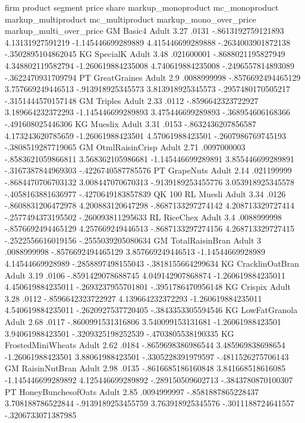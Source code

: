 firm	product	segment	price	share	markup_monoproduct	mc_monoproduct	markup_multiproduct	mc_multiproduct	markup_mono_over_price	markup_multi_over_price
GM	Basic4	Adult	3.27	.0131	-.8613192759121893	4.13131927591219	-1.145446699289889	4.415446699289888	-.2634003901872138	-.3502895104862045
KG	SpecialK	Adult	3.48	.021600001	-.8688021195827949	4.348802119582794	-1.260619884235008	4.740619884235008	-.2496557814893089	-.3622470931709794
PT	GreatGraines	Adult	2.9	.0088999998	-.8576692494465129	3.757669249446513	-.913918925345573	3.813918925345573	-.2957480170505217	-.3151444570157148
GM	Triples	Adult	2.33	.0112	-.8596642323722927	3.189664232372293	-1.145446699289893	3.475446699289893	-.368954606168366	-.491608025446306
KG	Mueslix	Adult	3.31	.0153	-.8632436207856587	4.173243620785659	-1.26061988423501	4.57061988423501	-.2607986769745193	-.3808519287719065
GM	OtmlRaisinCrisp	Adult	2.71	.0097000003	-.8583621059866811	3.568362105986681	-1.145446699289891	3.855446699289891	-.3167387844969303	-.4226740587785576
PT	GrapeNuts	Adult	2.14	.021199999	-.8684470706703132	3.008447070670313	-.9139189253455776	3.053918925345578	-.4058163881636977	-.4270649183857839
QK	100%
RL	Muesli	Adult	3.34	.0126	-.8608831206472978	4.200883120647298	-.8687133297274142	4.208713329727414	-.2577494373195502	-.260093811295633
RL	RiceChex	Adult	3.4	.0088999998	-.8576692494465129	4.257669249446513	-.8687133297274156	4.268713329727415	-.2522556616019156	-.2555039205080634
GM	TotalRaisinBran	Adult	3	.0088999998	-.8576692494465129	3.857669249446513	-1.14544669928989	4.14544669928989	-.2858897498155043	-.3818155664299634
KG	CracklinOatBran	Adult	3.19	.0106	-.8591429078688745	4.049142907868874	-1.260619884235011	4.450619884235011	-.2693237955701801	-.3951786470956148
KG	Crispix	Adult	3.28	.0112	-.8596642323722927	4.139664232372293	-1.260619884235011	4.540619884235011	-.2620927537720405	-.3843353305594546
KG	LowFatGranola	Adult	2.68	.0117	-.8600991531316806	3.540099153131681	-1.26061988423501	3.94061988423501	-.3209325198252539	-.4703805538190335
KG	FrostedMiniWheats	Adult	2.62	.0184	-.8659698386986544	3.485969838698654	-1.26061988423501	3.88061988423501	-.3305228391979597	-.4811526275706143
GM	RaisinNutBran	Adult	2.98	.0135	-.8616685186160848	3.841668518616085	-1.145446699289892	4.125446699289892	-.289150509602713	-.3843780870100307
PT	HoneyBunchesofOats	Adult	2.85	.0094999997	-.8581887865228437	3.708188786522844	-.9139189253455759	3.763918925345576	-.3011188724641557	-.3206733071387985
